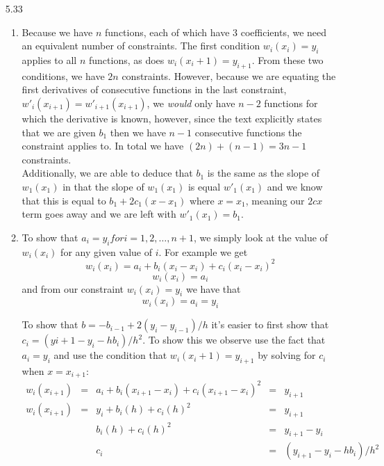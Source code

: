 \documentclass[11pt,a4paper]{article}
\begin{document}
\begin{itemize}
			\item[5.33]
				\begin{enumerate} [label={\alph*)}]
					\item Because we have $n$ functions, each of which have 3 coefficients, we need an equivalent number of constraints. The first condition $w_i(x_i) =y_i$ applies to all $n$ functions, as does $w_i(x_i+1)=y_{i+1}$. From these two conditions, we have $2n$ constraints. However, because we are equating the first derivatives of consecutive functions in the last constraint, $w'_{i}(x_{i+1}) = w'_{i+1}(x_{i+1})$, we \textit{would} only have $n-2$ functions for which the derivative is known, however, since the text explicitly states that we are given $b_1$ then we have $n-1$ consecutive functions the constraint applies to. In total we have $(2n)+(n-1)=3n-1$ constraints.\\
					
					Additionally, we are able to deduce that $b_1$ is the same as the slope of $w_1(x_1)$ in that the slope of $w_1(x_1)$ is equal $w'_1(x_1)$ and we know that this is equal to $b_1+2c_1(x-x_1)$ where $x=x_1$, meaning our $2cx$ term goes away and we are left with $w'_1(x_1)=b_1$.
					
					\item To show that $a_i=y_i for i=1,2,\dots,n+1$, we simply look at the value of $w_i(x_i)$ for any given value of $i$. For example we get 
					$$w_i(x_i)=a_i+b_i(x_i-x_i)+c_i(x_i-x_i)^2$$
					$$w_i(x_i)=a_i$$ 
					and from our constraint $w_i(x_i) =y_i$ we have that $$w_i(x_i) =a_i = y_i$$
					
					To show that $b = -b_{i-1}+2(y_i - y_{i-1} )/h$ it's easier to first show that $c_i = (y{i+1} - y_i - hb_i)/h^2$. To show this we observe use the fact that $a_i=y_i$ and use the condition that $w_i(x_i+1)=y_{i+1}$ by solving for $c_i$ when $x = x_{i+1}$:
					$$\begin{array}{ccccc}
						w_i(x_{i+1}) &=& a_i + b_i(x_{i+1}-x_i)+c_i(x_{i+1}-x_i)^2 &=& y_{i+1}\\
						w_i(x_{i+1}) &=& y_i + b_i(h)+c_i(h)^2 &=& y_{i+1} \\
						& & b_i(h)+c_i(h)^2 &=& y_{i+1}-y_i \\
						& & c_i &=& (y_{i+1}-y_i-hb_i)/h^2
					\end{array}$$
				

\end{enumerate}
\end{itemize}
\end{document}
